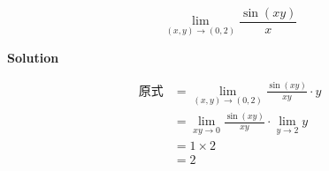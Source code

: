 \documentclass[12pt, a4paper]{article}
\numberwithin{equation}{section}
\begin{document}
    $$
        \lim_{\left(x,y\right) \rightarrow \left(0,2\right)} \frac{\sin\left(xy\right)}{x}
    $$
    \vspace{1em}

    \textbf{Solution}
    \vspace{1em}

    \begin{align*}
        \text{原式} &= \lim_{\left(x,y\right) \rightarrow \left(0,2\right)} \frac{\sin\left(xy\right)}{xy} \cdot y \\
        &=\lim_{xy \rightarrow 0} \frac{\sin\left(xy\right)}{xy} \cdot \lim_{y\rightarrow 2}y \\
        &= 1 \times 2 \\
        &= 2
    \end{align*}
\end{document}

